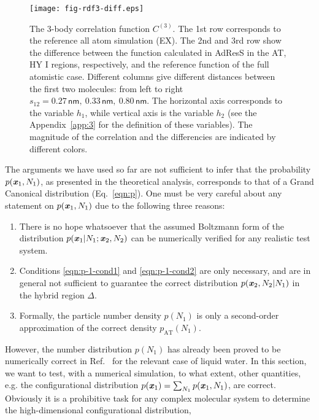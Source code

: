 \documentclass[aip,jcp,a4paper,reprint,onecolumn]{revtex4-1}
\newcommand{\vect}[1]{\textbf{\textit{#1}}}
\newcommand{\AT}{{\textrm{{AT}}}}
\newcommand{\HY}{{\Delta}}
\newcommand{\corr}{C^{(3)}}
\begin{document}
\begin{figure}
  \centering
  \texttt{[image: fig-rdf3-diff.eps]}
  \caption{The 3-body correlation function $\corr$.  The 1st row corresponds to the reference all atom simulation (EX).
    The 2nd and 3rd row show the difference between the function calculated in AdResS in the AT, HY I
    regions, respectively, and the reference function of the full atomistic case.
    Different columns give different distances between
    the first two molecules: from left to right $s_{12} =
    0.27\,\textsf{nm},\ 0.33\,\textsf{nm},\  
    0.80\,\textsf{nm}$.  The horizontal axis corresponds to the variable $h_1$, while vertical
    axis is the variable $h_2$ (see the Appendix~\ref{app:3} for the
    definition of these variables).  The magnitude of the correlation
    and the differencies are indicated by
    different colors.
  }
  \label{fig:tmp2b}
\end{figure}
The arguments we have used so far are not sufficient to infer that the probability $p(\vect x_1 , N_1)$,
as presented in the theoretical analysis, corresponds to that of a Grand Canonical distribution  (Eq.~\eqref{eqn:p}).
One must be very careful about any statement on $p(\vect x_1, N_1)$ 
due to the following three reasons:
\begin{enumerate}
\item There is no hope whatsoever that the assumed Boltzmann form of the distribution $p(\vect x_1|N_1; \vect x_2, N_2)$ can be numerically verified  for any realistic test system. 
\item Conditions \eqref{eqn:p-1-cond1} and \eqref{eqn:p-1-cond2}
are only necessary, and are in general not sufficient to guarantee
the correct distribution $p(\vect x_2, N_2 | N_1)$ in the hybrid region $\HY$.
\item Formally, the particle number density $p(N_1)$ is only a second-order approximation of the correct density $p_{\AT}(N_{1})$.
\end{enumerate}
However, the number distribution $p(N_1)$ has already
been proved to be numerically correct in Ref.~ for the relevant case of liquid water. In this section, we want to test, with a numerical simulation, to what extent, other quantities, e.g. the configurational distribution $p(\vect x_1) = \sum_{N_1}p(\vect x_1, N_1)$, are correct. 
Obviously it is a prohibitive task for any complex molecular system to determine the high-dimensional configurational distribution,
\end{document}
